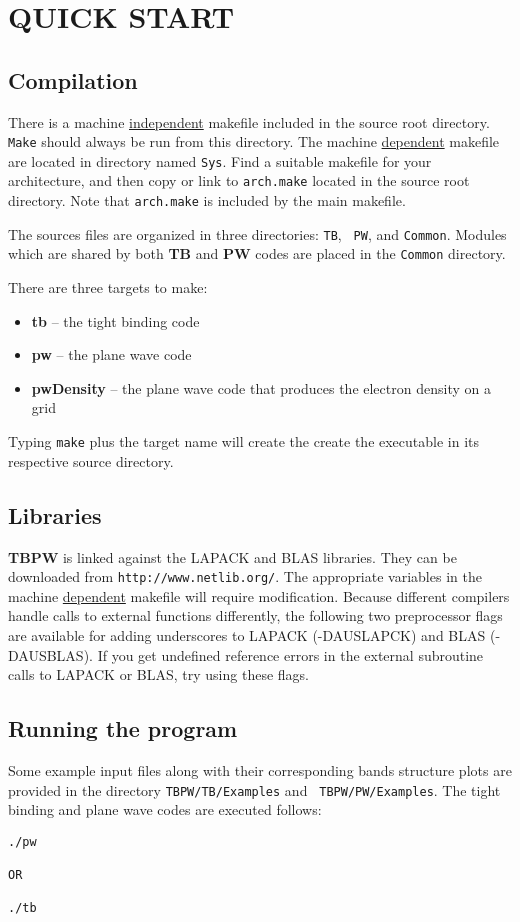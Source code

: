 \section{QUICK START}

\subsection{Compilation}
There is a machine \underline{independent} makefile included in the
source root directory. {\tt Make} should always be run from this
directory. The machine \underline{dependent} makefile are located in
directory named {\tt Sys}. Find a suitable makefile for your
architecture, and then copy or link to {\tt arch.make} located in the
source root directory. Note that {\tt arch.make} is included by the main
makefile.

The sources files are organized in three directories: {\tt TB}, {\tt
PW}, and {\tt Common}. Modules which are shared by both {\bf TB} and
{\bf PW} codes are placed in the {\tt Common} directory.

There are three targets to make:
\begin{itemize}
\item {\bf tb} -- the tight binding code
\item {\bf pw} -- the plane wave code
\item {\bf pwDensity} -- the plane wave code that produces the electron
density on a grid
\end{itemize}

Typing {\tt make} plus the target name will create the create the
executable in its respective source directory.

\subsection{Libraries}
{\bf TBPW} is linked against the LAPACK and BLAS libraries. They can
be downloaded from {\tt http://www.netlib.org/}. The appropriate
variables in the machine \underline{dependent} makefile will require
modification.  Because different compilers handle calls to external
functions differently, the following two preprocessor flags are
available for adding underscores to LAPACK (-DAUSLAPCK) and BLAS
(-DAUSBLAS). If you get undefined reference errors in the external
subroutine calls to LAPACK or BLAS, try using these flags.

\subsection{Running the program}
Some example input files along with their corresponding bands structure
plots are provided in the directory {\tt TBPW/TB/Examples} and {\tt
TBPW/PW/Examples}. The tight binding and plane wave codes are
executed follows:
\begin{verbatim}
./pw 

OR

./tb
\end{verbatim}


